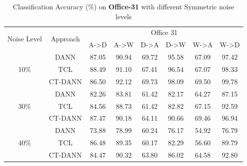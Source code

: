 \begin{center}
\begin{table}[h!]
    \centering
    \begin{tabular}{|c|c|c|c|c|c|c|c|}
    \hline
    \multirow{2}{3em}{Noise Level} & \multirow{2}{4em}{Approach} &  \multicolumn{6}{|c|}{Office 31}\\
    \cline{3-8}
    & & A->D & A->W & D->A & D->W & W->A & W->D\\
    \hline
    \multirow{3}{3em}{10\%} & DANN & 87.05 & 90.94 & 69.72 & 95.58 & 67.09 & 97.42 \\
    & TCL & 88.49 & 91.10 & 67.41 & 96.54 & 67.07 & 98.33\\
    & CT-DANN & 86.50 & 92.12 & 69.73 & 98.09 & 69.50 & 99.78\\
    \hline
    \multirow{3}{3em}{30\%} & DANN & 82.26 & 83.81 & 61.42 & 82.17 & 64.27 & 87.15 \\
    & TCL & 84.56 & 88.73 & 61.42 & 82.82 & 67.15 & 92.59\\
    & CT-DANN & 87.47 & 90.18 & 64.11 & 90.66 & 69.46 & 96.94\\
    \hline
    \multirow{3}{3em}{40\%} & DANN & 73.88 & 78.99 & 60.24 & 76.17 & 54.92 & 76.79 \\
    & TCL & 86.48 & 89.35 & 60.17 & 82.29 & 56.60 & 89.79\\
    & CT-DANN & 84.47 & 90.32 & 63.80 & 86.02 & 64.58 & 92.80\\
    \hline
    \end{tabular}
    \caption{Classification Accuracy (\%) on \textbf{Office-31} with different Symmetric noise levels}
    \label{tab:office_sym}
    \end{table}
\end{center}

